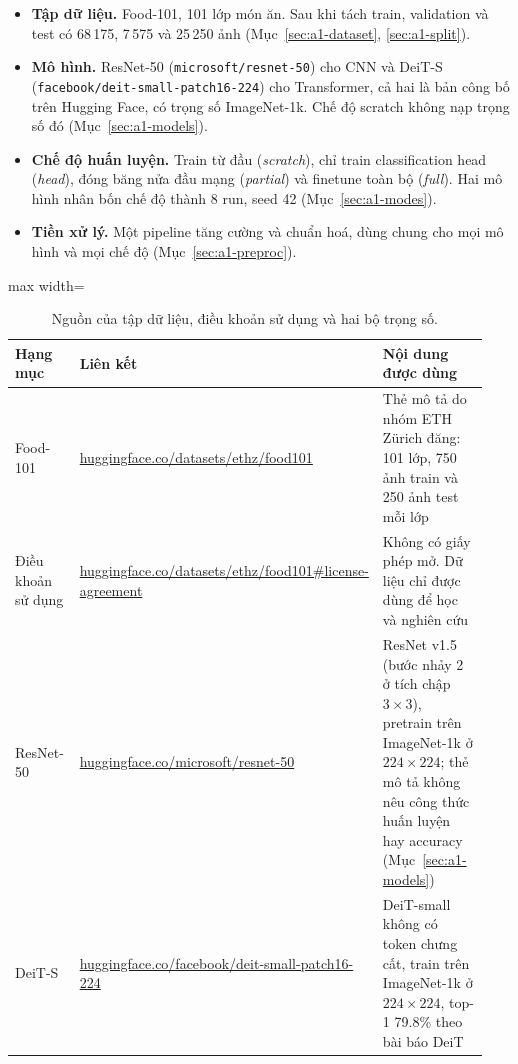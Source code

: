 \documentclass[11pt,a4paper]{article}
\begin{document}
\begin{itemize}
\item \textbf{Tập dữ liệu.} Food-101, 101 lớp món ăn. Sau khi tách train, validation và test có 68\,175, 7\,575 và 25\,250 ảnh (Mục~\ref{sec:a1-dataset}, \ref{sec:a1-split}).
\item \textbf{Mô hình.} ResNet-50 (\texttt{microsoft/resnet-50}) cho CNN và DeiT-S (\texttt{facebook/deit-small-patch16-224}) cho Transformer, cả hai là bản công bố trên Hugging Face, có trọng số ImageNet-1k. Chế độ scratch không nạp trọng số đó (Mục~\ref{sec:a1-models}).
\item \textbf{Chế độ huấn luyện.} Train từ đầu (\emph{scratch}), chỉ train classification head (\emph{head}), đóng băng nửa đầu mạng (\emph{partial}) và finetune toàn bộ (\emph{full}). Hai mô hình nhân bốn chế độ thành 8 run, seed 42 (Mục~\ref{sec:a1-modes}).
\item \textbf{Tiền xử lý.} Một pipeline tăng cường và chuẩn hoá, dùng chung cho mọi mô hình và mọi chế độ (Mục~\ref{sec:a1-preproc}).
\end{itemize}

\begin{table}[!htbp]
\centering
\small
\begin{adjustbox}{max width=\linewidth}
\begin{tabular}{p{0.18\linewidth}>{\raggedright\hyphenpenalty=10000\exhyphenpenalty=10000}p{0.34\linewidth}p{0.42\linewidth}}
\toprule
Hạng mục & Liên kết & Nội dung được dùng \\
\midrule
Food-101 & \href{https://huggingface.co/datasets/ethz/food101}{huggingface.co/\allowbreak datasets/\allowbreak ethz/\allowbreak food101} & Thẻ mô tả do nhóm ETH Zürich đăng: 101 lớp, 750 ảnh train và 250 ảnh test mỗi lớp \\
\addlinespace
Điều khoản sử dụng & \href{https://huggingface.co/datasets/ethz/food101\#license-agreement}{huggingface.co/\allowbreak datasets/\allowbreak ethz/\allowbreak food101\#\allowbreak license-agreement} & Không có giấy phép mở. Dữ liệu chỉ được dùng để học và nghiên cứu \\
\addlinespace
ResNet-50 & \href{https://huggingface.co/microsoft/resnet-50}{huggingface.co/\allowbreak microsoft/\allowbreak resnet-50} & ResNet v1.5 (bước nhảy 2 ở tích chập \(3\times3\)), pretrain trên ImageNet-1k ở \(224\times224\); thẻ mô tả không nêu công thức huấn luyện hay accuracy (Mục~\ref{sec:a1-models}) \\
\addlinespace
DeiT-S & \href{https://huggingface.co/facebook/deit-small-patch16-224}{huggingface.co/\allowbreak facebook/\allowbreak deit-small-\allowbreak patch16-224} & DeiT-small không có token chưng cất, train trên ImageNet-1k ở \(224\times224\), top-1 79.8\% theo bài báo DeiT \\
\bottomrule
\end{tabular}
\end{adjustbox}
\caption{Nguồn của tập dữ liệu, điều khoản sử dụng và hai bộ trọng số.}
\label{tab:a1-links}
\end{table}
\end{document}
